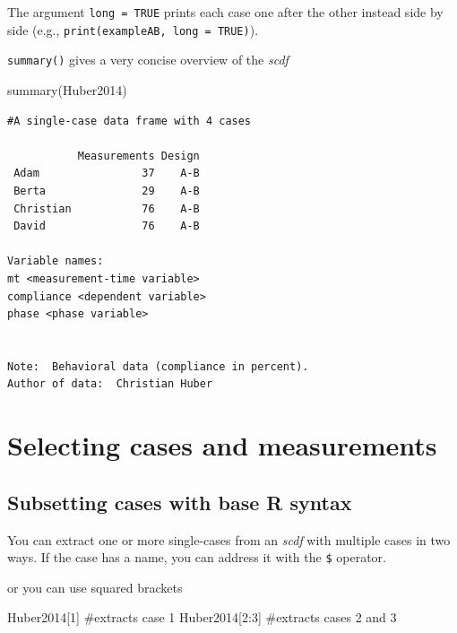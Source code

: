 \documentclass[
  letterpaper,
  DIV=11,
  numbers=noendperiod]{scrreprt}
\newenvironment{Shaded}{\begin{snugshade}}{\end{snugshade}}
\newcommand{\CommentTok}[1]{\textcolor[rgb]{0.37,0.37,0.37}{#1}}
\newcommand{\DecValTok}[1]{\textcolor[rgb]{0.68,0.00,0.00}{#1}}
\newcommand{\FunctionTok}[1]{\textcolor[rgb]{0.28,0.35,0.67}{#1}}
\newcommand{\NormalTok}[1]{\textcolor[rgb]{0.00,0.23,0.31}{#1}}
\newcommand{\SpecialCharTok}[1]{\textcolor[rgb]{0.37,0.37,0.37}{#1}}
\begin{document}
The argument \texttt{long\ =\ TRUE} prints each case one after the other
instead side by side (e.g., \texttt{print(exampleAB,\ long\ =\ TRUE)}).

\texttt{summary()} gives a very concise overview of the \emph{scdf}

\begin{Shaded}
\begin{Highlighting}[]
\FunctionTok{summary}\NormalTok{(Huber2014)}
\end{Highlighting}
\end{Shaded}

\begin{verbatim}
#A single-case data frame with 4 cases

           Measurements Design
 Adam                37    A-B
 Berta               29    A-B
 Christian           76    A-B
 David               76    A-B

Variable names:
mt <measurement-time variable>
compliance <dependent variable>
phase <phase variable>


Note:  Behavioral data (compliance in percent).
Author of data:  Christian Huber 
\end{verbatim}

\hypertarget{selecting-cases-and-measurements}{%
\section{Selecting cases and
measurements}\label{selecting-cases-and-measurements}}

\hypertarget{subsetting-cases-with-base-r-syntax}{%
\subsection{Subsetting cases with base R
syntax}\label{subsetting-cases-with-base-r-syntax}}

You can extract one or more single-cases from an \emph{scdf} with
multiple cases in two ways. If the case has a name, you can address it
with the \texttt{\$} operator.

\begin{Shaded}
\end{Shaded}

or you can use squared brackets

\begin{Shaded}
\begin{Highlighting}[]
\NormalTok{Huber2014[}\DecValTok{1}\NormalTok{] }\CommentTok{\#extracts case 1}
\NormalTok{Huber2014[}\DecValTok{2}\SpecialCharTok{:}\DecValTok{3}\NormalTok{] }\CommentTok{\#extracts cases 2 and 3}
\end{Highlighting}
\end{Shaded}
\end{document}
